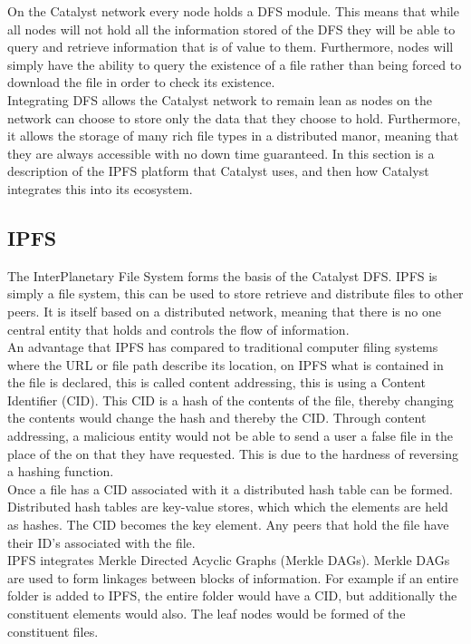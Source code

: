\documentclass{article}
\begin{document}
On the Catalyst network every node holds a DFS module. This means that while all nodes will not hold all the information stored of the DFS they will be able to query and retrieve information that is of value to them. Furthermore, nodes will simply have the ability to query the existence of a file rather than being forced to download the file in order to check
its existence. \\

Integrating DFS allows the Catalyst network to remain lean as nodes on the network can choose to store only the data that they choose to hold. Furthermore, it allows the storage of many rich file types in a distributed manor, meaning that they are always accessible with no down time guaranteed. In this section is a description of the IPFS platform that Catalyst uses, and then how Catalyst integrates this into its ecosystem.


\subsection{IPFS}

The InterPlanetary File System forms the basis of the Catalyst DFS. IPFS is simply a file system, this can be used to store retrieve and distribute files to other peers. It is itself based on a distributed network, meaning that there is no one central entity that holds and controls the flow of information. \\

An advantage that IPFS has compared to traditional computer filing systems where the URL or file path describe its location, on IPFS what is contained in the file is declared, this is called content addressing, this is using a Content Identifier (CID). This CID is a hash of the contents of the file, thereby changing the contents would change the hash and thereby the CID. Through content addressing, a malicious entity would not be able to send a user a false file in the place of the on that they have requested. This is due to the hardness of reversing a hashing function.\\

Once a file has a CID associated with it a distributed hash table can be formed. Distributed hash tables are key-value stores, which which the elements are held as hashes. The CID becomes the key element. Any peers that hold the file have their ID's associated with the file.  \\

IPFS integrates Merkle Directed Acyclic Graphs (Merkle DAGs). Merkle DAGs are used to form linkages between blocks of information. For example if an entire folder is added to IPFS, the entire folder would have a CID, but additionally the constituent elements would also. The leaf nodes would be formed of the constituent files.
\end{document}
